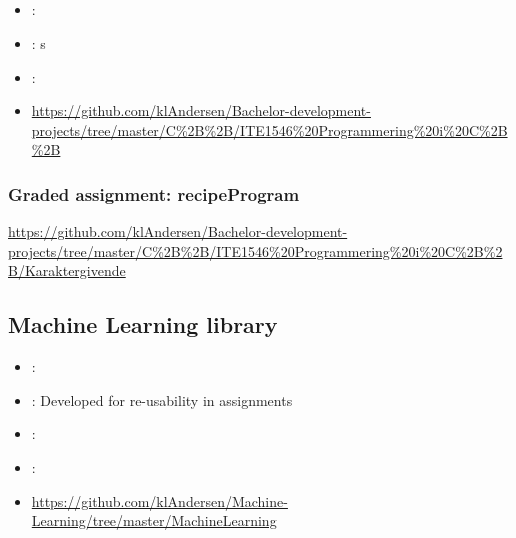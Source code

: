 \label{sec:section3}

\subsection[C++ course]{}
\label{sec:cpp_programming}
\begin{itemize} 
	\item {}: 
	\item {}: s
	\item {}: 
	\item {} \url{https://github.com/klAndersen/Bachelor-development-projects/tree/master/C%2B%2B/ITE1546%20Programmering%20i%20C%2B%2B}
\end{itemize} 

\subsubsection{Graded assignment: recipeProgram} %
\label{sec:recipe_program}
 \url{https://github.com/klAndersen/Bachelor-development-projects/tree/master/C%2B%2B/ITE1546%20Programmering%20i%20C%2B%2B/Karaktergivende}

\subsection{Machine Learning library}
\label{sec:ml_library}
\begin{itemize} 
	\item {}: 
	\item {}: Developed for re-usability in assignments
	\item {}: 
	\item {}: 
	\item {} \url{https://github.com/klAndersen/Machine-Learning/tree/master/MachineLearning}
\end{itemize} 

